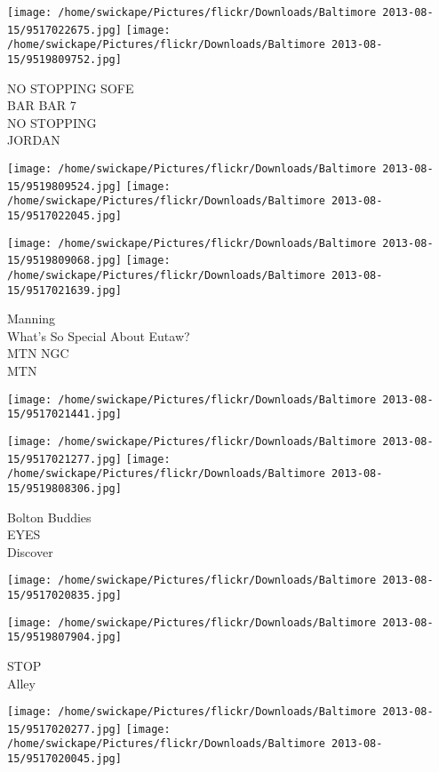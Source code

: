 \documentclass[10pt,letterpaper]{article}
\begin{document}
\texttt{[image: /home/swickape/Pictures/flickr/Downloads/Baltimore 2013-08-15/9517022675.jpg]}
\texttt{[image: /home/swickape/Pictures/flickr/Downloads/Baltimore 2013-08-15/9519809752.jpg]}

NO STOPPING SOFE\\
BAR BAR 7\\
NO STOPPING\\
JORDAN
\pagebreak

\texttt{[image: /home/swickape/Pictures/flickr/Downloads/Baltimore 2013-08-15/9519809524.jpg]}
\texttt{[image: /home/swickape/Pictures/flickr/Downloads/Baltimore 2013-08-15/9517022045.jpg]}

\texttt{[image: /home/swickape/Pictures/flickr/Downloads/Baltimore 2013-08-15/9519809068.jpg]}
\texttt{[image: /home/swickape/Pictures/flickr/Downloads/Baltimore 2013-08-15/9517021639.jpg]}

Manning\\
What's So Special About Eutaw?\\
MTN NGC\\
MTN
\pagebreak

\texttt{[image: /home/swickape/Pictures/flickr/Downloads/Baltimore 2013-08-15/9517021441.jpg]}

\vspace{0.25in}
\texttt{[image: /home/swickape/Pictures/flickr/Downloads/Baltimore 2013-08-15/9517021277.jpg]}
\texttt{[image: /home/swickape/Pictures/flickr/Downloads/Baltimore 2013-08-15/9519808306.jpg]}

Bolton Buddies\\
EYES\\
Discover
\pagebreak

\texttt{[image: /home/swickape/Pictures/flickr/Downloads/Baltimore 2013-08-15/9517020835.jpg]}

\vspace{0.25in}
\texttt{[image: /home/swickape/Pictures/flickr/Downloads/Baltimore 2013-08-15/9519807904.jpg]}

STOP\\
Alley
\pagebreak

\texttt{[image: /home/swickape/Pictures/flickr/Downloads/Baltimore 2013-08-15/9517020277.jpg]}
\texttt{[image: /home/swickape/Pictures/flickr/Downloads/Baltimore 2013-08-15/9517020045.jpg]}
\end{document}

